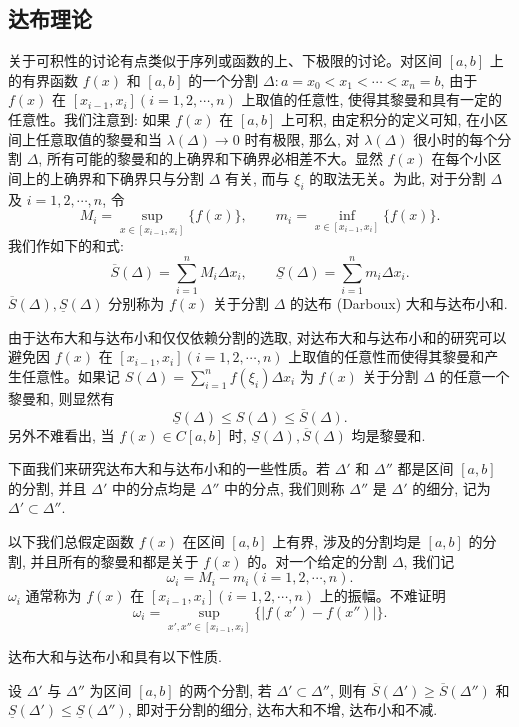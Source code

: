 \subsection{达布理论}
\label{subsec:ma-7-2-2}

关于可积性的讨论有点类似于序列或函数的上、下极限的讨论。对区间 $[a,b]$ 上的有界函数 $f(x)$ 和 $[a,b]$ 的一个分割 $\Delta:a=x_0<x_1<\cdots<x_n=b$, 由于 $f(x)$ 在 $[x_{i-1},x_i](i=1,2,\cdots,n)$ 上取值的任意性, 使得其黎曼和具有一定的任意性。我们注意到: 如果 $f(x)$ 在 $[a,b]$ 上可积, 由定积分的定义可知, 在小区间上任意取值的黎曼和当 $\lambda(\Delta)\to0$ 时有极限, 那么, 对 $\lambda(\Delta)$ 很小时的每个分割 $\Delta$, 所有可能的黎曼和的上确界和下确界必相差不大。显然 $f(x)$ 在每个小区间上的上确界和下确界只与分割 $\Delta$ 有关, 而与 $\xi_i$ 的取法无关。为此, 对于分割 $\Delta$ 及 $i=1,2,\cdots,n$, 令
\[
  M_i=\sup_{x\in[x_{i-1},x_i]}\{f(x)\},\qquad
  m_i=\inf_{x\in[x_{i-1},x_i]}\{f(x)\}.
\]
我们作如下的和式:
\[
  \overline S(\Delta)=\sum_{i=1}^n M_i\Delta x_i,\qquad
  \underline S(\Delta)=\sum_{i=1}^n m_i\Delta x_i.
\]
$\overline S(\Delta),\underline S(\Delta)$ 分别称为 $f(x)$ 关于分割 $\Delta$ 的达布 (Darboux) 大和与达布小和.

由于达布大和与达布小和仅仅依赖分割的选取, 对达布大和与达布小和的研究可以避免因 $f(x)$ 在 $[x_{i-1},x_i](i=1,2,\cdots,n)$ 上取值的任意性而使得其黎曼和产生任意性。如果记 $S(\Delta)=\sum\limits_{i=1}^n f(\xi_i)\Delta x_i$ 为 $f(x)$ 关于分割 $\Delta$ 的任意一个黎曼和, 则显然有
\[
  \underline S(\Delta)\leq S(\Delta)\leq \overline S(\Delta).
\]
另外不难看出, 当 $f(x)\in C[a,b]$ 时, $\underline S(\Delta),\overline S(\Delta)$ 均是黎曼和.

下面我们来研究达布大和与达布小和的一些性质。若 $\Delta'$ 和 $\Delta''$ 都是区间 $[a,b]$ 的分割, 并且 $\Delta'$ 中的分点均是 $\Delta''$ 中的分点, 我们则称 $\Delta''$ 是 $\Delta'$ 的细分, 记为 $\Delta'\subset\Delta''$.

以下我们总假定函数 $f(x)$ 在区间 $[a,b]$ 上有界, 涉及的分割均是 $[a,b]$ 的分割, 并且所有的黎曼和都是关于 $f(x)$ 的。对一个给定的分割 $\Delta$, 我们记
\[
  \omega_i=M_i-m_i(i=1,2,\cdots,n).
\]
$\omega_i$ 通常称为 $f(x)$ 在 $[x_{i-1},x_i](i=1,2,\cdots,n)$ 上的振幅。不难证明
\[
  \omega_i=\sup_{x',x''\in[x_{i-1},x_i]}\{|f(x')-f(x'')|\}.
\]

达布大和与达布小和具有以下性质.

\begin{property}\label{property:ma-7-2-2}
设 $\Delta'$ 与 $\Delta''$ 为区间 $[a,b]$ 的两个分割, 若 $\Delta'\subset\Delta''$, 则有 $\overline S(\Delta')\geq\overline S(\Delta'')$ 和 $\underline S(\Delta')\leq\underline S(\Delta'')$, 即对于分割的细分, 达布大和不增, 达布小和不减.
\end{property}


